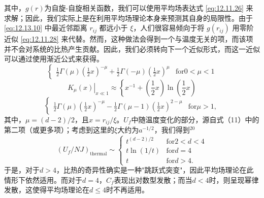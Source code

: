 其中，\(g(r)\)为自旋-自旋相关函数，我们可以使用平均场表达式 \autoref{eq:12.11.26} 来求解；因此，我们实际上是在利用平均场理论本身来预测其自身的局限性。由于 \autoref{eq:12.13.10} 中最近邻距离 \(r_{ij}\) 都远小于 \(\xi\)，人们很容易倾向于将 \(g(r_{ij})\) 用零阶近似 \autoref{eq:12.11.28} 来代替。然而，这种做法会得到一个与温度无关的项，而该项并不会对系统的比热产生贡献。因此，我们必须转向下一个近似形式，而这一近似可以通过使用渐近公式来获得。
\begin{equation}\tag{12.13.11}\label{eq:12.13.11}
\left\{ \begin{array}{ll} { \displaystyle { \frac { 1 } { 2 } } \Gamma ( \mu ) \left( \frac { 1 } { 2 } x \right) ^{- \mu} + \frac { 1 } { 2 } \Gamma ( - \mu ) \left( \frac { 1 } { 2 } x \right) ^{\mu} } & { \mathrm { f o r }  0 < \mu < 1 } \end{array} \right.
\end{equation}
\begin{equation}\tag{12.13.12}\label{eq:12.13.12}
\left. K _ { \mu } ( x ) \right| _ { x \ll 1 } \approx \left\{ x ^{- 1} + \left( { \frac { 1 } { 2 } } x \right) \ln \left( { \frac { 1 } { 2 } } x \right) \right.
\end{equation}
\begin{equation}\tag{12.13.13}\label{eq:12.13.13}
\left\{ \begin{array}{ll} { \displaystyle { \frac { 1 } { 2 } } \Gamma ( \mu ) \left( \frac { 1 } { 2 } x \right) ^{- \mu} - \frac { 1 } { 2 } \Gamma ( \mu - 1 ) \left( \frac { 1 } { 2 } x \right) ^{2 - \mu} } & { \mathrm { f o r }  \mu > 1 , } \end{array} \right.
\end{equation}
其中，\(\mu=(d-2)/2\)，且\(x=r_{ij}/\xi\)。\(U_{f}\)中随温度变化的部分，源自式（11）中的第二项（或更多项）；考虑到这里的\(\xi\)大约为\(a^{-1/2}\)，我们得到\(^{20}\)
\begin{equation}\tag{12.13.14}\label{eq:12.13.14}
( U _ { f } / N J ) _ { \mathrm { t h e r m a l } } \sim \left\{ \begin{array}{ll} { t ^{( d - 2 ) / 2} } & { \mathrm { f o r }  2 < d < 4 } \\{ t \ln ( 1 / t ) } & { \mathrm { f o r }  d = 4 } \\{ t } & { \mathrm { f o r }  d > 4 . } \end{array} \right.
\end{equation}
于是，对于\(d > 4\)，比热的奇异性确实是一种"跳跃式突变"，因此平均场理论在此情形下依然适用。而对于\(d = 4\)，\(C_f\)表现出对数型发散；而当\(d < 4\)时，则呈现幂律发散，这使得平均场理论在\(d \leq 4\)时不再适用。
